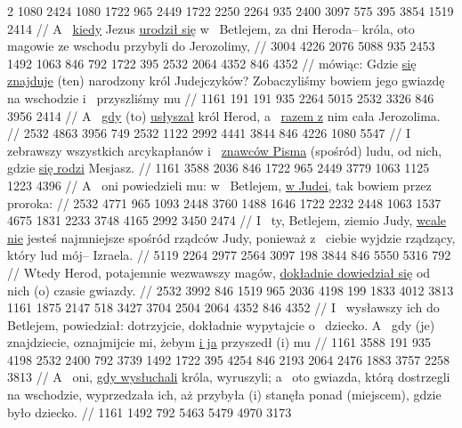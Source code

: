 \begingl
\lettrine[loversize=1,lraise=-1.3]{2 }{}%
 1080 2424 1080 1722 965 2449 1722 2250 2264 935 2400 3097 575 395 3854 1519 2414
//
\glb
 A~ \underline{kiedy} Jezus \underline{urodził się} w~ Betlejem,  za dni Heroda– króla, oto magowie ze wschodu przybyli do Jerozolimy,
//
\endgl
\begingl
\gla
{} 3004 4226 2076 {} 5088 935 2453 1492 1063 846 792 1722 395 2532 2064 4352 846 4352
//
\glb
{} mówiąc: Gdzie \underline{się znajduje} (ten) narodzony król Judejczyków? Zobaczyliśmy bowiem jego gwiazdę na wschodzie i~ przyszliśmy  mu 
//
\endgl
\begingl
\gla
{} 1161 191 {} 191 935 2264 5015 2532 3326 846 3956 2414
//
\glb
{} A~ \underline{gdy} (to) \underline{usłyszał} król Herod,  a~ \underline{razem z} nim cała Jerozolima.
//
\endgl
\begingl
\gla
{} 2532 4863 3956 749 2532 1122 {} 2992 4441 3844 846 4226 1080 5547
//
\glb
{} I~ zebrawszy wszystkich arcykapłanów i~ \underline{znawców Pisma} (spośród) ludu,  od nich, gdzie \underline{się rodzi} Mesjasz.
//
\endgl
\begingl
\gla
{} 1161 3588 2036 846 1722 965 2449 3779 1063 1125 1223 4396
//
\glb
{} A~ oni powiedzieli mu: w~ Betlejem, \underline{w Judei,} tak bowiem  przez proroka:
//
\endgl
\begingl
\gla
{} 2532 4771 965 1093 2448 3760 1488 1646 1722 2232 2448 1063 1537 4675 1831 2233 3748 4165 2992 3450 2474
//
\glb
{} I~ ty, Betlejem, ziemio Judy, \underline{wcale nie} jesteś najmniejsze spośród rządców Judy, ponieważ z~ ciebie wyjdzie rządzący, który  lud mój– Izraela.
//
\endgl
\begingl
\gla
{} 5119 2264 2977 2564 3097 198 3844 846 {} 5550 5316 792
//
\glb
{} Wtedy Herod, potajemnie wezwawszy magów, \underline{dokładnie dowiedział się} od nich (o) czasie  gwiazdy.
//
\endgl
\begingl
\gla
{} 2532 3992 846 1519 965 2036 4198 199 1833 4012 3813 1161 1875 {} 2147 518 3427 3704 2504 2064 {} 4352 846 4352
//
\glb
{} I~ wysławszy ich do Betlejem, powiedział: dotrzyjcie, dokładnie wypytajcie o~ dziecko. A~ gdy (je) znajdziecie, oznajmijcie mi, żebym \underline{i ja} przyszedł (i)  mu 
//
\endgl
\begingl
\gla
{} 1161 3588 191 935 4198 2532 2400 792 3739 1492 1722 395 4254 846 2193 2064 {} 2476 1883 {} 3757 2258 3813
//
\glb
{} A~ oni, \underline{gdy wysłuchali} króla, wyruszyli; a~ oto gwiazda, którą dostrzegli na wschodzie, wyprzedzała ich, aż przybyła (i) stanęła ponad (miejscem), gdzie było dziecko.
//
\endgl
\begingl
\gla
{} 1161 1492 792 5463 5479 4970 3173
